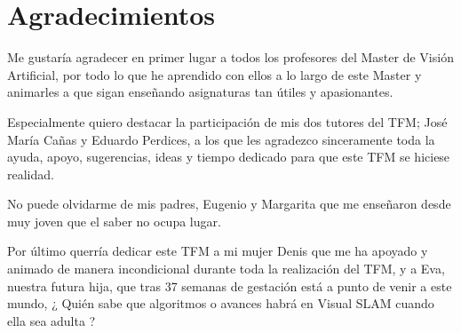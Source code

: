 \chapter*{Agradecimientos}
Me gustaría agradecer en primer lugar a todos los profesores del Master de Visión Artificial, por todo lo que he aprendido con ellos a lo largo de este Master y animarles a que sigan enseñando asignaturas tan útiles y apasionantes.

Especialmente quiero destacar la participación de mis dos tutores del TFM; José María Cañas y Eduardo Perdices, a los que les agradezco sinceramente toda la ayuda, apoyo, sugerencias, ideas y tiempo dedicado para que este TFM se hiciese realidad.

No puede olvidarme de mis padres, Eugenio y Margarita que me enseñaron desde muy joven que el saber no ocupa lugar.

Por último querría dedicar este TFM a mi mujer Denis que me ha apoyado y animado de manera incondicional durante toda la realización del TFM, y a Eva, nuestra futura hija, que tras 37 semanas de gestación está a punto de venir a este mundo, ¿ Quién sabe que algoritmos o avances habrá en Visual SLAM cuando ella sea adulta ?
